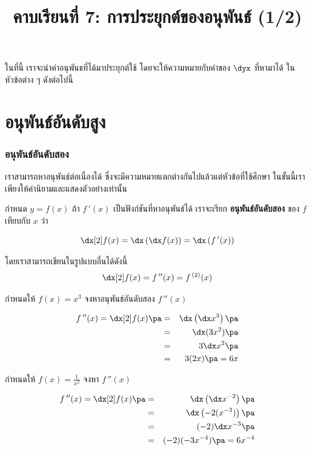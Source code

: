 \title{คาบเรียนที่ 7: การประยุกต์ของอนุพันธ์ (1/2)}
\frame{\titlepage}

\begin{frame}
ในที่นี้ เราจะนำค่าอนุพันธที่ได้มาประยุกต์ใช้ โดยจะให้ความหมายกับค่าของ $\dyx$ ที่หามาได้ ในหัวข้อต่าง ๆ ดังต่อไปนี้
\tableofcontents
\end{frame}


\section[อันดับสูง]{อนุพันธ์อันดับสูง}
\frame{\sectionpage}

\begin{frame}
\frametitle{อนุพันธ์อันดับสอง}
เราสามารถหาอนุพันธ์ต่อเนื่องได้ ซึ่งจะมีความหมายแตกต่างกันไปแล้วแต่หัวข้อที่ใช้ศึกษา ในขั้นนี้เราเพียงให้คำนิยามและแสดงตัวอย่างเท่านั้น
\begin{defn}{}{}
กำหนด $y = f(x)$ ถ้า $f\,'(x)$ เป็นฟังก์ชันที่หาอนุพันธ์ได้ \pa เราจะเรียก \textbf{อนุพันธ์อันดับสอง} ของ $f$ เทียบกับ $x$ ว่า

\[ \dx[2] f(x) = \dx \left( \dx f(x) \right) = \dx \left( f\,'(x) \right)\]

\pa โดยเราสามารถเขียนในรูปแบบอื่นได้ดังนี้
\[\dx[2] f(x) = f\,''(x) = f^{\,(2)}(x)\]
\end{defn}
\end{frame}


\begin{frame}[t]
\begin{ex}
กำหนดให้ $f(x) = x^3$ จงหาอนุพันธ์อันดับสอง $f\,''(x)$ \pa
\end{ex}
\begin{sol} 
\begin{eqnarray*}
f\,''(x) = \dx[2] f(x) \pa &=& \dx \left( \dx x^3 \right)  \pa\\
&=&  \dx (3x^2) \pa \\
&=& 3 \dx x^2 \pa \\
&=& 3(2x) \pa = 6x
\end{eqnarray*}
\end{sol}
\end{frame}


\begin{frame}[t]
\begin{ex}
กำหนดให้ $f(x) = \frac{1}{x^2}$ จงหา $f\,''(x)$ \pa
\end{ex}
\begin{sol}
\begin{eqnarray*}
f\,''(x) = \dx[2] f(x) \pa &=& \dx \left( \dx x^{-2} \right) \pa \\
&=&  \dx \left( -2(x^{-3}) \right) \pa \\
&=& (-2) \dx x^{-3} \pa \\
&=& (-2)(-3x^{-4}) \pa = 6x^{-4} 
\end{eqnarray*}
\end{sol}
\end{frame}


